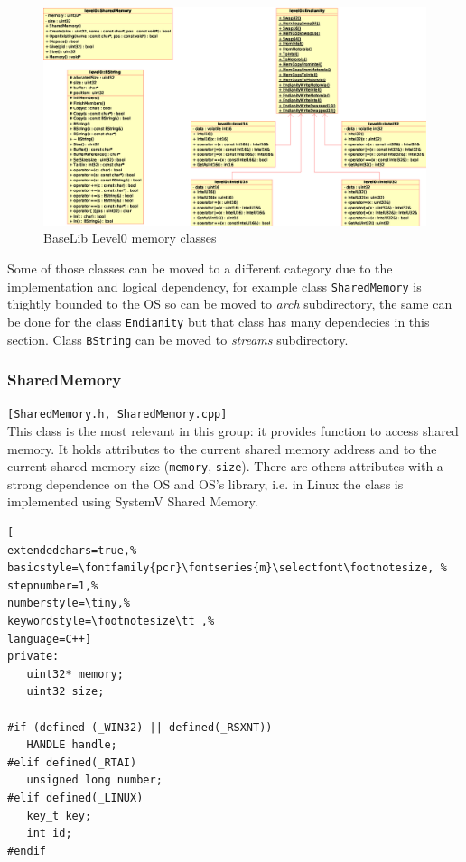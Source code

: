 \begin{figure}[h!]
 \begin{center}
  \includegraphics[width=\textwidth]{level0/level0-mem.eps}
  \caption{BaseLib Level0 memory classes}
  \label{f:level0:mem}
 \end{center}
\end{figure}

Some of those classes can be moved to a different category due to the implementation and logical dependency, for example class \texttt{SharedMemory} is thightly bounded to the OS so can be moved to \textit{arch} subdirectory, the same can be done for the class \texttt{Endianity} but that class has many dependecies in this section. Class \texttt{BString} can be moved to \textit{streams} subdirectory.



\subsubsection{SharedMemory}
\texttt{[SharedMemory.h, SharedMemory.cpp]}\\
This class is the most relevant in this group: it provides function to access shared memory. It holds attributes to the current shared memory address and to the current shared memory size (\texttt{memory}, \texttt{size}). There are others attributes with a strong dependence on the OS and OS's library, i.e. in Linux the class is implemented using SystemV Shared Memory.

\begin{lstlisting}[
extendedchars=true,%
basicstyle=\fontfamily{pcr}\fontseries{m}\selectfont\footnotesize, %
stepnumber=1,%
numberstyle=\tiny,%
keywordstyle=\footnotesize\tt ,%
language=C++]
private:
   uint32* memory;
   uint32 size;

#if (defined (_WIN32) || defined(_RSXNT))
   HANDLE handle;
#elif defined(_RTAI)
   unsigned long number;
#elif defined(_LINUX)
   key_t key;
   int id;
#endif
\end{lstlisting}

